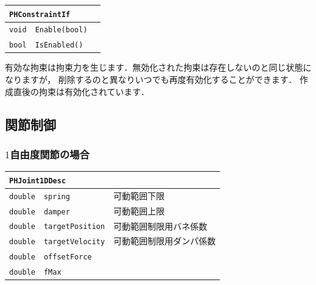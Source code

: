 \begin{center}
\begin{tabular}{p{.15\hsize}p{.50\hsize}p{.25\hsize}}
\multicolumn{3}{l}{\texttt{PHConstraintIf}}						\\ \midrule
\texttt{void}	& \texttt{Enable(bool)}					& \\
\texttt{bool} 	& \texttt{IsEnabled()}					& \\
\end{tabular}
\end{center}

\KLUDGE 有効な拘束は拘束力を生じます．無効化された拘束は存在しないのと同じ状態になりますが，
\KLUDGE 削除するのと異なりいつでも再度有効化することができます．
\KLUDGE 作成直後の拘束は有効化されています．





\subsection*{関節制御}

\subsubsection*{$1$自由度関節の場合}

\begin{center}
\begin{tabular}{p{.15\hsize}p{.45\hsize}p{.30\hsize}}
\multicolumn{3}{l}{\texttt{PHJoint1DDesc}}								\\ \midrule
\texttt{double}	&	\texttt{spring}			& 可動範囲下限				\\
\texttt{double}	&	\texttt{damper}			& 可動範囲上限				\\
\texttt{double}	&	\texttt{targetPosition}	& 可動範囲制限用バネ係数	\\
\texttt{double}	&	\texttt{targetVelocity}	& 可動範囲制限用ダンパ係数	\\
\texttt{double}	&	\texttt{offsetForce}	& \\
\texttt{double}	&	\texttt{fMax}			& \\
\end{tabular}
\end{center}

